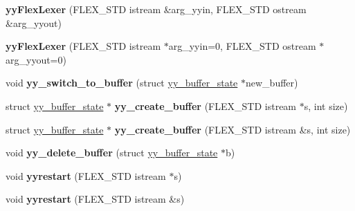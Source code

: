 \begin{DoxyCompactItemize}
\item 
{\bfseries yy\+Flex\+Lexer} (F\+L\+E\+X\+\_\+\+S\+TD istream \&arg\+\_\+yyin, F\+L\+E\+X\+\_\+\+S\+TD ostream \&arg\+\_\+yyout)\hypertarget{classyyFlexLexer_a71277668405175be0b3ad2da9088f9dc}{}\label{classyyFlexLexer_a71277668405175be0b3ad2da9088f9dc}

\item 
{\bfseries yy\+Flex\+Lexer} (F\+L\+E\+X\+\_\+\+S\+TD istream $\ast$arg\+\_\+yyin=0, F\+L\+E\+X\+\_\+\+S\+TD ostream $\ast$arg\+\_\+yyout=0)\hypertarget{classyyFlexLexer_a327ec30fcb12fcdbff3a0b776ed40504}{}\label{classyyFlexLexer_a327ec30fcb12fcdbff3a0b776ed40504}

\item 
void {\bfseries yy\+\_\+switch\+\_\+to\+\_\+buffer} (struct \hyperlink{structyy__buffer__state}{yy\+\_\+buffer\+\_\+state} $\ast$new\+\_\+buffer)\hypertarget{classyyFlexLexer_ad1d304c93cf758e1ae4db98d9ca35ad0}{}\label{classyyFlexLexer_ad1d304c93cf758e1ae4db98d9ca35ad0}

\item 
struct \hyperlink{structyy__buffer__state}{yy\+\_\+buffer\+\_\+state} $\ast$ {\bfseries yy\+\_\+create\+\_\+buffer} (F\+L\+E\+X\+\_\+\+S\+TD istream $\ast$s, int size)\hypertarget{classyyFlexLexer_acb89297b91ceb1984a37bbdb6c3fdbb0}{}\label{classyyFlexLexer_acb89297b91ceb1984a37bbdb6c3fdbb0}

\item 
struct \hyperlink{structyy__buffer__state}{yy\+\_\+buffer\+\_\+state} $\ast$ {\bfseries yy\+\_\+create\+\_\+buffer} (F\+L\+E\+X\+\_\+\+S\+TD istream \&s, int size)\hypertarget{classyyFlexLexer_a1d54b19e6c6ad6a8c0df3086f3a5fbd0}{}\label{classyyFlexLexer_a1d54b19e6c6ad6a8c0df3086f3a5fbd0}

\item 
void {\bfseries yy\+\_\+delete\+\_\+buffer} (struct \hyperlink{structyy__buffer__state}{yy\+\_\+buffer\+\_\+state} $\ast$b)\hypertarget{classyyFlexLexer_a645a8ebb5b2b5b80707d053a0eb7a21a}{}\label{classyyFlexLexer_a645a8ebb5b2b5b80707d053a0eb7a21a}

\item 
void {\bfseries yyrestart} (F\+L\+E\+X\+\_\+\+S\+TD istream $\ast$s)\hypertarget{classyyFlexLexer_ab337dd3bd9504644164c0600d960b6e2}{}\label{classyyFlexLexer_ab337dd3bd9504644164c0600d960b6e2}

\item 
void {\bfseries yyrestart} (F\+L\+E\+X\+\_\+\+S\+TD istream \&s)\hypertarget{classyyFlexLexer_a93912cbe7061eb193ee69e48132d16ae}{}\label{classyyFlexLexer_a93912cbe7061eb193ee69e48132d16ae}


\end{DoxyCompactItemize}
